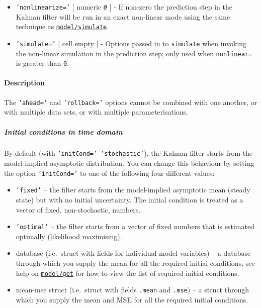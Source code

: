\begin{itemize}
\item
  \texttt{'nonlinearize='} {[} numeric \textbar{} \emph{\texttt{0}} {]}
  - If non-zero the prediction step in the Kalman filter will be run in
  an exact non-linear mode using the same technique as
  \href{model/simulate}{\texttt{model/simulate}}.
\item
  \texttt{'simulate='} {[} cell \textbar{} empty {]} - Options passed in
  to \texttt{simulate} when invoking the non-linear simulation in the
  prediction step; only used when \texttt{nonlinear=} is greater than
  \texttt{0}.
\end{itemize}

\paragraph{Description}

The \texttt{'ahead='} and \texttt{'rollback='} options cannot be
combined with one another, or with multiple data sets, or with multiple
parameterisations.

\subparagraph{Initial conditions in time
domain}

By default (with \texttt{'initCond=' 'stochastic'}), the Kalman filter
starts from the model-implied asymptotic distribution. You can change
this behaviour by setting the option \texttt{'initCond='} to one of the
following four different values:

\begin{itemize}
\item
  \texttt{'fixed'} -- the filter starts from the model-implied
  asymptotic mean (steady state) but with no initial uncertainty. The
  initial condition is treated as a vector of fixed, non-stochastic,
  numbers.
\item
  \texttt{'optimal'} -- the filter starts from a vector of fixed numbers
  that is estimated optimally (likelihood maximising).
\item
  database (i.e.~struct with fields for individual model variables) -- a
  database through which you supply the mean for all the required
  initial conditions, see help on \href{model/get}{\texttt{model/get}}
  for how to view the list of required initial conditions.
\item
  mean-mse struct (i.e.~struct with fields \texttt{.mean} and
  \texttt{.mse}) -- a struct through which you supply the mean and MSE
  for all the required initial conditions.
\end{itemize}

